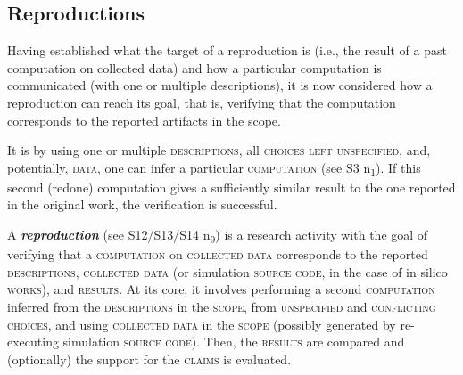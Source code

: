\documentclass[authordate, meta]{jote-new-article}
\begin{document}
	



	\subsection{Reproductions}



	Having established what the target of a reproduction is (i.e., the result of a past computation on collected data) and how a particular computation is communicated (with one or multiple descriptions), it is now considered how a reproduction can reach its goal, that is, verifying that the computation corresponds to the reported artifacts in the scope.



	It is by using one or multiple \textsc{descriptions}, all \textsc{choices left unspecified}, and, potentially, \textsc{data}, one can infer a particular \textsc{computation} (see S3 \rightarrow{ }n\textsubscript{1}). If this second (redone) computation gives a sufficiently similar result to the one reported in the original work, the verification is successful.




	\vspace{\topsep}


	\noindent A \emph{\textbf{reproduction}} (see S12/S13/S14 \rightarrow{ }n\textsubscript{9}) is a research activity with the goal of verifying that a \textsc{computation} on \textsc{collected data} corresponds to the reported \textsc{descriptions}, \textsc{collected data} (or simulation \textsc{source code}, in the case of in silico \textsc{works}), and \textsc{results}. At its core, it involves performing a second \textsc{computation} inferred from the \textsc{descriptions} in the \textsc{scope}, from \textsc{unspecified} and \textsc{conflicting choices}, and using \textsc{collected data} in the \textsc{scope} (possibly generated by re-executing simulation \textsc{source code}). Then, the \textsc{results} are compared and (optionally) the support for the \textsc{claims} is evaluated.
\end{document}
